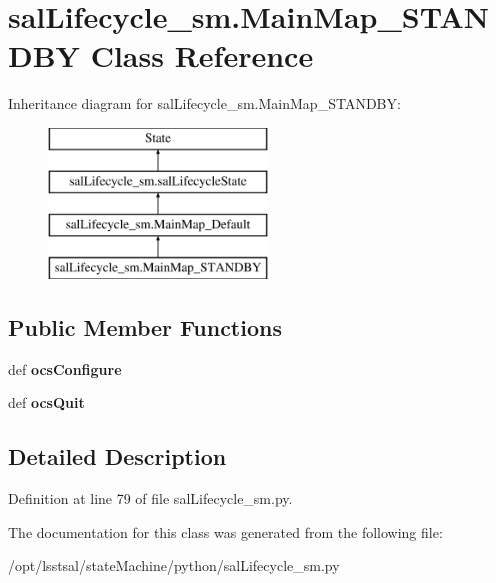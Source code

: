 \hypertarget{classsal_lifecycle__sm_1_1_main_map___s_t_a_n_d_b_y}{\section{sal\-Lifecycle\-\_\-sm.\-Main\-Map\-\_\-\-S\-T\-A\-N\-D\-B\-Y Class Reference}
\label{classsal_lifecycle__sm_1_1_main_map___s_t_a_n_d_b_y}
}
Inheritance diagram for sal\-Lifecycle\-\_\-sm.\-Main\-Map\-\_\-\-S\-T\-A\-N\-D\-B\-Y\-:\begin{figure}[H]
\begin{center}
\leavevmode
\includegraphics[height=4.000000cm]{classsal_lifecycle__sm_1_1_main_map___s_t_a_n_d_b_y}
\end{center}
\end{figure}
\subsection*{Public Member Functions}
\begin{DoxyCompactItemize}
\item 
\hypertarget{classsal_lifecycle__sm_1_1_main_map___s_t_a_n_d_b_y_ac44fd76aaf23c2d75885086bf0e5f024}{def {\bfseries ocs\-Configure}}\label{classsal_lifecycle__sm_1_1_main_map___s_t_a_n_d_b_y_ac44fd76aaf23c2d75885086bf0e5f024}

\item 
\hypertarget{classsal_lifecycle__sm_1_1_main_map___s_t_a_n_d_b_y_a7005de02474d9e0affb8c94b5d7c08e9}{def {\bfseries ocs\-Quit}}\label{classsal_lifecycle__sm_1_1_main_map___s_t_a_n_d_b_y_a7005de02474d9e0affb8c94b5d7c08e9}

\end{DoxyCompactItemize}


\subsection{Detailed Description}


Definition at line 79 of file sal\-Lifecycle\-\_\-sm.\-py.



The documentation for this class was generated from the following file\-:\begin{DoxyCompactItemize}
\item 
/opt/lsstsal/state\-Machine/python/sal\-Lifecycle\-\_\-sm.\-py\end{DoxyCompactItemize}

